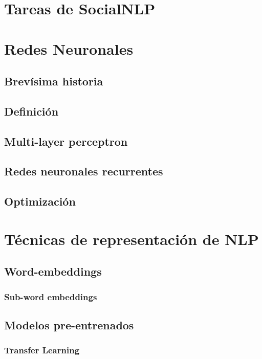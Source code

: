 \section{Tareas de SocialNLP}


\section{Redes Neuronales}

\subsection{Brevísima historia}
\subsection{Definición}
\subsection{Multi-layer perceptron}
\subsection{Redes neuronales recurrentes}
\subsection{Optimización}


\section{Técnicas de representación de NLP}
\subsection{Word-embeddings}

\subsubsection{Sub-word embeddings}

\subsection{Modelos pre-entrenados}

\subsubsection{Transfer Learning}

